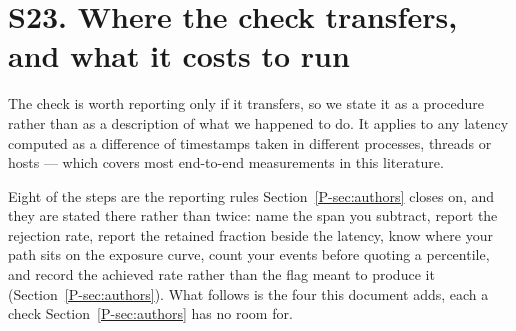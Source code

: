 \documentclass[10pt,journal,onecolumn]{IEEEtran}
\newcommand{\mainAuthors}{\ref{P-sec:authors}}        %
\begin{document}
\section{S23. Where the check transfers, and what it costs to run}

The check is worth reporting only if it transfers, so we state it as a procedure rather than as
a description of what we happened to do. It applies to any latency computed as a difference of
timestamps taken in different processes, threads or hosts --- which covers most end-to-end
measurements in this literature.

Eight of the steps are the reporting rules Section~\mainAuthors{} closes on, and they are stated
there rather than twice: name the span you subtract, report the rejection rate, report
the retained fraction beside the latency, know where your path sits on the exposure curve,
count your events before quoting a percentile, and record the achieved rate rather than
the flag meant to produce it (Section~\mainAuthors{}). What follows is the four this
document adds, each a check Section~\mainAuthors{} has no room for.
\end{document}
